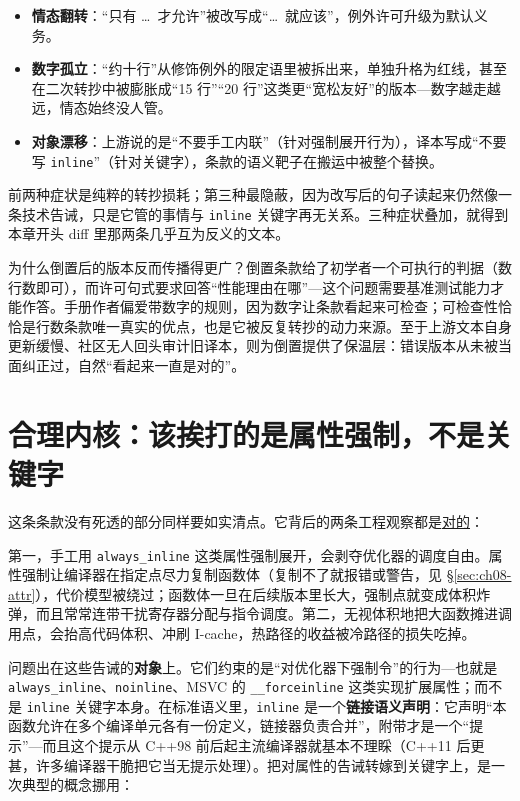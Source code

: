 \documentclass[12pt,a4paper,fontset=fandol]{ctexbook}
\newcommand{\cpp}[1]{C++#1}
\newcommand{\Tp}[1]{\texttt{#1}}
\newcommand{\Bk}{\discretionary{}{}{}}
\begin{document}
\begin{itemize}
  \item \textbf{情态翻转}：``只有 \ldots\ 才允许''被改写成``\ldots\ 就应该''，例外许可升级为默认义务。
  \item \textbf{数字孤立}：``约十行''从修饰例外的限定语里被拆出来，单独升格为红线，甚至在二次转抄中被膨胀成``15 行''``20 行''这类更``宽松友好''的版本---数字越走越远，情态始终没人管。
  \item \textbf{对象漂移}：上游说的是``不要手工内联''（针对强制展开行为），译本写成``不要写 \Tp{inline}''（针对关键字），条款的语义靶子在搬运中被整个替换。
\end{itemize}

前两种症状是纯粹的转抄损耗；第三种最隐蔽，因为改写后的句子读起来仍然像一条技术告诫，只是它管的事情与 \Tp{inline} 关键字再无关系。三种症状叠加，就得到本章开头 diff 里那两条几乎互为反义的文本。

为什么倒置后的版本反而传播得更广？倒置条款给了初学者一个可执行的判据（数行数即可），而许可句式要求回答``性能理由在哪''---这个问题需要基准测试能力才能作答。手册作者偏爱带数字的规则，因为数字让条款看起来可检查；可检查性恰恰是行数条款唯一真实的优点，也是它被反复转抄的动力来源。至于上游文本自身更新缓慢、社区无人回头审计旧译本，则为倒置提供了保温层：错误版本从未被当面纠正过，自然``看起来一直是对的''。

\section{合理内核：该挨打的是属性强制，不是关键字}
\label{sec:ch09-kernel}

这条条款没有死透的部分同样要如实清点。它背后的两条工程观察都是\underline{对的}：

第一，手工用 \Tp{always\_inline} 这类属性强制展开，会剥夺优化器的调度自由。属性强制让编译器在指定点尽力复制函数体（复制不了就报错或警告，见 \S\ref{sec:ch08-attr}），代价模型被绕过；函数体一旦在后续版本里长大，强制点就变成体积炸弹，而且常常连带干扰寄存器分配与指令调度。第二，无视体积地把大函数摊进调用点，会抬高代码体积、冲刷 I-cache，热路径的收益被冷路径的损失吃掉。

问题出在这些告诫的\textbf{对象}上。它们约束的是``对优化器下强制令''的行为---也就是 \Tp{always\Bk\_inline}、\Tp{noinline}、MSVC 的 \Tp{\_\_forcein{\Bk}line} 这类实现扩展属性；而不是 \Tp{inline} 关键字本身。在标准语义里，\Tp{inline} 是一个\textbf{链接语义声明}：它声明``本函数允许在多个编译单元各有一份定义，链接器负责合并''，附带才是一个``提示''---而且这个提示从 \cpp{98} 前后起主流编译器就基本不理睬（\cpp{11} 后更甚，许多编译器干脆把它当无提示处理）。把对属性的告诫转嫁到关键字上，是一次典型的概念挪用：
\end{document}
